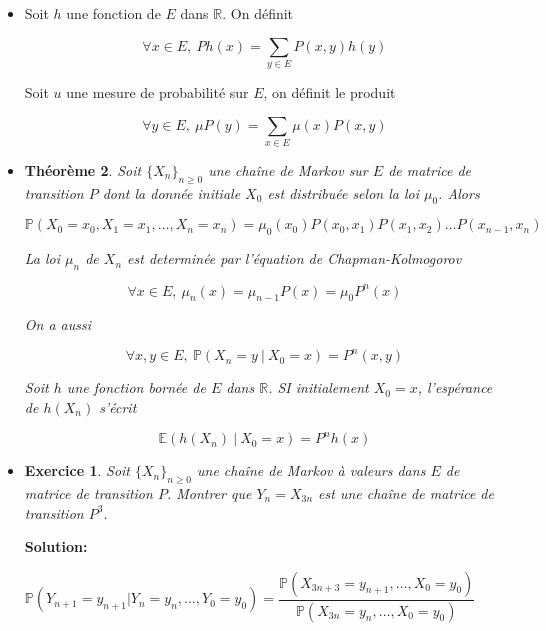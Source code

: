 \documentclass[10pt,a4paper,oneside]{article}
\newtheorem{theoreme}{Théorème}
\newtheorem{exercice}{Exercice}
\begin{document}
\begin{itemize}
\begin{theoreme}[Récurrence aléatoire]
La récurrence aléatoire $\{ X_n \}_{n \geq 0}$

\[ n \geq 0,\ X_{n + 1} = f(X_n,\xi_{n + 1}) \]

est une chaîne de Markov.
\end{theoreme}

\textbf{Remarque:} la matrice de transition s'écrit $\boxed{ P(x,y) = \mathbb{P}(f(x,\xi_1) = y) }$

\item
Soit $h$ une fonction de $E$ dans $\mathbb{R}$. On définit

\[ \forall x \in E,\ Ph(x) = \sum_{y \in E}P(x,y) h(y) \]

Soit $u$ une mesure de probabilité sur $E$, on définit le produit

\[ \forall y \in E,\ \mu P(y) = \sum_{x \in E} \mu(x) P(x,y) \]

\item
\begin{theoreme}
Soit $\{ X_n \}_{n \geq 0}$ une chaîne de Markov sur $E$ de matrice de transition $P$ dont la donnée initiale $X_0$ est distribuée selon la loi $\mu_0$. Alors

\[ \mathbb{P}(X_0 = x_0,X_1 = x_1,\ldots,X_n = x_n) = \mu_0(x_0) P(x_0,x_1) P(x_1,x_2) \ldots P(x_{n - 1},x_n) \]

La loi $\mu_n$ de $X_n$ est determinée par l'équation de Chapman-Kolmogorov

\[ \forall x \in E,\ \mu_n(x) = \mu_{n - 1} P(x) = \mu_0 P^n(x) \]

On a aussi

\[ \forall x,y \in E,\ \mathbb{P}(X_n = y\ |\ X_0 = x) = P^n(x,y) \]

Soit $h$ une fonction bornée de $E$ dans $\mathbb{R}$. SI initialement $X_0 = x$, l'espérance de $h(X_n)$ s'écrit

\[ \mathbb{E}(h(X_n)\ |\ X_0 = x) = P^nh(x) \]
\end{theoreme}

\item

\begin{exercice}
Soit $\{ X_n \}_{n \geq 0}$ une chaîne de Markov à valeurs dans $E$ de matrice de transition $P$. Montrer que $Y_n = X_{3n}$ est une chaîne de matrice de transition $P^3$.
\end{exercice}

\textbf{Solution:}

$\mathbb{P}(Y_{n + 1} = y_{n + 1} | Y_n = y_n, \ldots, Y_0 = y_0) = \dfrac{\mathbb{P}(X_{3n + 3} = y_{n + 1},\ldots,X_0 = y_0)}{\mathbb{P}(X_{3n} = y_n,\ldots,X_0 = y_0)}$


\end{itemize}
\end{document}
